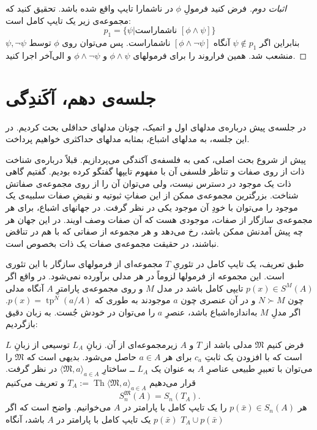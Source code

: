 \documentclass[12pt,a4paper]{report}
\theoremstyle{colorhead}
\DeclareMathOperator{\Th}{Th}
\DeclareMathOperator{\tp}{tp}
\begin{document}
\begin{proof}[اثبات دوم]
فرض کنید فرمولِ
$\phi$
در ناشمارا تایپ واقع شده باشد. تحقیق کنید که مجموعه‌ی زیر یک تایپ کامل است:
\[
p_1=\{\psi| \text{ناشماراست }[\phi\wedge\psi]\}
\]
بنابراین اگر
$\psi\not\in p_1$
آنگاه
$[\phi\wedge\neg\psi]$
ناشماراست. پس می‌توان روی
$\phi$
توسط
$\psi,\neg\psi$
منشعب شد. همین فراروند را برای فرمولهای
$\phi\wedge\psi$
و 
$\phi\wedge\neg\psi$
و الی‌آخر اجرا کنید. 

\end{proof}
\pagebreak
\section{جلسه‌ی دهم، آکَندِگی}
در جلسه‌ی پیش درباره‌ی 
مدلهای اول و اتمیک، چونان
مدلهای حداقلی بحث کردیم. در این جلسه، به مدلهای اشباع، بمثابه مدلهای حداکثری خواهیم پرداخت.
\par 
پیش از شروع بحث اصلی، کمی به فلسفه‌ی آکندگی می‌پردازیم. 
قبلاً درباره‌ی شناخت ذات از روی صفات و تناظر فلسفی آن با مفهوم تایپها گفتگو کرده‌ بودیم. گفتیم
گاهی ذات یک موجود در دسترس نیست، ولی می‌توان آن را از روی مجموعه‌ی صفاتش شناخت.  بزرگترین مجموعه‌ی ممکن از این صفاتِ ثبوتیه  و نقیضِ‌ صفات سلبیه‌ی یک موجود را می‌توان با خودِ آن موجود یکی در نظر گرفت. در جهانهای اشباع، برای هر مجموعه‌ی سازگار از صفات، موجودی هست که آن صفات وصف اویند.
در این جهان هر چه پیش آمدنش ممکن باشد، رخ می‌دهد و هر مجموعه‌ از صفاتی که با هم در تناقض نباشند، در حقیقت مجموعه‌ی صفات یک ذات بخصوص است. 
\par 
طبق تعریف، یک تایپ کامل در تئوریِ
$T$
 مجموعه‌ای از فرمولهای سازگار با این تئوری است. این مجموعه از فرمولها لزوماً در هر مدلی برآورده نمی‌شود. در واقع اگر
 $p(x)\in S^M(A)$
 تایپی کامل باشد در مدل 
 $M$
 و روی مجموعه‌ی پارامترِ
 $A$
 آنگاه مدلی چون
 $N\succ M$
 و در آن عنصری چون
 $a$
 موجودند به طوری که
 $p(x)=\tp^N(a/A)$.
 اگر مدلِ
 $M$
 به‌اندازه‌اشباع باشد، عنصرِ
 $a$
 را می‌توان در خودش جُست. به زبان دقیق بازگردیم:
 \par 
فرض کنیم
$\mathfrak{M}$
مدلی باشد از
$T$
و 
$A$
زیرمجموعه‌ای از آن. زبانِ
$L_A$
توسیعی از زبانِ
$L$
است که با افزودن یک ثابتِ
$c_a$
برای هر
$a\in A$
حاصل می‌شود. بدیهی است که 
$\mathfrak{M}$
را می‌توان با تعبیرِ طبیعی عناصرِ
$A$
به عنوان یک
$L_A$
ــ‌
ساختارِ
$\langle \mathfrak{M},a\rangle_{a\in A}$
 در نظر گرفت. قرار می‌دهیم
\mbox{$T_A:=\Th\langle \mathfrak{M},a\rangle_{a\in A}$}
 و تعریف می‌کنیم
\[S_n^\mathfrak{M}(A)=S_n(T_A).\]
هر
$p(\bar{x})\in S_n(A)$
را یک تایپ کامل با پارامتر در
$A$
می‌خوانیم. واضح است که اگر
$p(\bar{x})$
یک تایپ کامل با پارامتر در
$A$
باشد، آنگاه
$T_A\cup p(\bar{x})$
\end{document}
